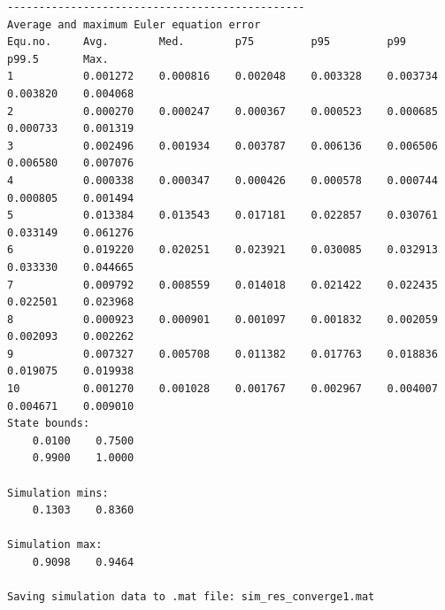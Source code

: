 \documentclass{article}
\begin{document}
\begin{verbatim}
-----------------------------------------------
Average and maximum Euler equation error
Equ.no.		Avg.		Med.		p75			p95			p99			p99.5		Max.
1			0.001272	0.000816	0.002048	0.003328	0.003734	0.003820	0.004068
2			0.000270	0.000247	0.000367	0.000523	0.000685	0.000733	0.001319
3			0.002496	0.001934	0.003787	0.006136	0.006506	0.006580	0.007076
4			0.000338	0.000347	0.000426	0.000578	0.000744	0.000805	0.001494
5			0.013384	0.013543	0.017181	0.022857	0.030761	0.033149	0.061276
6			0.019220	0.020251	0.023921	0.030085	0.032913	0.033330	0.044665
7			0.009792	0.008559	0.014018	0.021422	0.022435	0.022501	0.023968
8			0.000923	0.000901	0.001097	0.001832	0.002059	0.002093	0.002262
9			0.007327	0.005708	0.011382	0.017763	0.018836	0.019075	0.019938
10			0.001270	0.001028	0.001767	0.002967	0.004007	0.004671	0.009010
State bounds:
    0.0100    0.7500
    0.9900    1.0000

Simulation mins:
    0.1303    0.8360

Simulation max:
    0.9098    0.9464

Saving simulation data to .mat file: sim_res_converge1.mat
\end{verbatim} \color{black}




\end{document}
